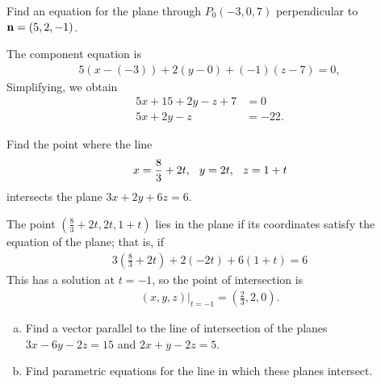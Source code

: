 \documentclass[12pt,letterpaper,reqno]{article}
\numberwithin{equation}{section}
\begin{document}
\begin{example}
Find an equation for the plane through $P_0(-3,0,7)$ perpendicular to ${\bf n}=(5,2,-1)$.	
\end{example}

{\color{red} 
The component equation is 
\begin{align*}
	5(x-(-3))+2(y-0)+(-1)(z-7)=0,
\end{align*}
Simplifying, we obtain
\begin{align*}
	5x+15+2y-z+7&=0 \\
	5x+2y-z&=-22.
\end{align*}}

\begin{example}
Find the point where the line 
\begin{align*}
	x=\frac{8}{3}+2t, \hspace{0.25cm} y=2t, \hspace{0.25cm} z=1+t
\end{align*}	
intersects the plane $3x+2y+6z=6$.
\end{example}

{\color{red} 
The point $(\frac{8}{3}+2t, 2t, 1+t)$ lies in the plane if its coordinates satisfy the equation of the plane; that is, if
\begin{align*}
	3(\frac{8}{3}+2t)+2(-2t)+6(1+t)=6
\end{align*}
This has a solution at $t=-1$, so the point of intersection is 
\begin{align*}
	(x,y,z)\vert_{t=-1}=(\frac{2}{3},2,0).
\end{align*}}

\begin{exercise}
\begin{enumerate}[(a)]
	\item Find a vector parallel to the line of intersection of the planes $3x-6y-2z=15$ and $2x+y-2z=5$.	
	\item Find parametric equations for the line in which these planes intersect.
\end{enumerate}
\end{exercise}
\end{document}
